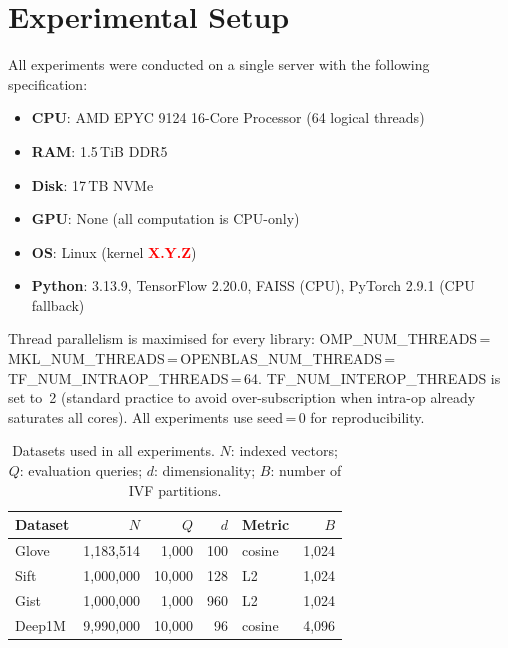 %
%

\newcommand{\placeholder}[1]{\textcolor{red}{\textbf{#1}}}%

\section{Experimental Setup}
\label{sec:appendix:setup}

All experiments were conducted on a single server with the following
specification:

\begin{itemize}
  \item \textbf{CPU}: AMD EPYC 9124 16-Core Processor (64 logical threads)
  \item \textbf{RAM}: 1.5\,TiB DDR5
  \item \textbf{Disk}: 17\,TB NVMe
  \item \textbf{GPU}: None (all computation is CPU-only)
  \item \textbf{OS}: Linux (kernel \placeholder{X.Y.Z})
  \item \textbf{Python}: 3.13.9, TensorFlow 2.20.0, FAISS (CPU), PyTorch 2.9.1 (CPU fallback)
\end{itemize}

Thread parallelism is maximised for every library:
OMP\_NUM\_THREADS\,=\,MKL\_NUM\_THREADS\,=\,OPENBLAS\_NUM\_THREADS\,=\,TF\_NUM\_INTRAOP\_THREADS\,=\,64.
TF\_NUM\_INTEROP\_THREADS is set to~2 (standard practice to avoid
over-subscription when intra-op already saturates all cores).
All experiments use seed\,=\,0 for reproducibility.

\begin{table}[h]
\centering
\caption{Datasets used in all experiments.
         $N$: indexed vectors; $Q$: evaluation queries; $d$: dimensionality;
         $B$: number of IVF partitions.}
\label{tab:appendix:datasets}
\begin{tabular}{lrrrlr}
\toprule
Dataset & $N$ & $Q$ & $d$ & Metric & $B$ \\
\midrule
Glove   & 1{,}183{,}514 &  1{,}000 & 100 & cosine & 1{,}024 \\
Sift    & 1{,}000{,}000 & 10{,}000 & 128 & L2     & 1{,}024 \\
Gist    & 1{,}000{,}000 &  1{,}000 & 960 & L2     & 1{,}024 \\
Deep1M  & 9{,}990{,}000 & 10{,}000 &  96 & cosine & 4{,}096 \\
\bottomrule
\end{tabular}
\end{table}


